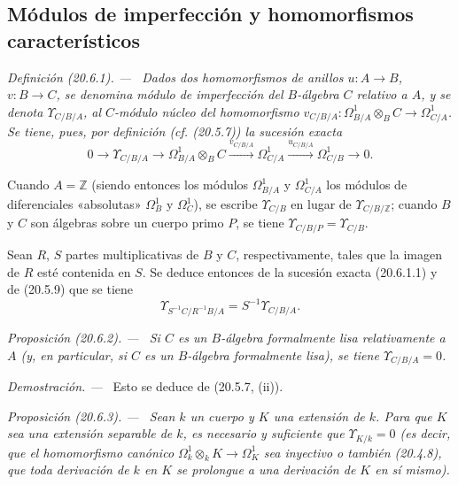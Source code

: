 \documentclass[10pt,oneside]{book}
\makeatletter
\newcommand{\setmanualcurrentlabel}[1]{\def\@currentlabel{#1}}
\newenvironment{definition}[1][]{%
  \setmanualcurrentlabel{#1}\par\medskip\noindent\itshape Definición (#1). ---\ }{\par}
\newenvironment{proposition}[1][]{%
  \setmanualcurrentlabel{#1}\par\medskip\noindent\itshape Proposición (#1). ---\ }{\par}
\newenvironment{proof}{%
  \par\medskip\noindent\textit{Demostración. ---\ }}{\par}
\makeatother
\begin{document}
\subsection{Módulos de imperfección y homomorfismos característicos}
\label{subsection:0.20.6-es}
\label{0.20.6-es}

\begin{definition}[20.6.1]
\label{0.20.6.1-es}
Dados dos homomorfismos de anillos $u:A\to B$, $v:B\to C$, se
denomina \emph{módulo de imperfección} del $B$-álgebra $C$ relativo a
$A$, y se denota $\Upsilon_{C/B/A}$, al $C$-módulo núcleo del
homomorfismo
$v_{C/B/A}:\Omega^1_{B/A}\otimes_B C\to\Omega^1_{C/A}$.
Se tiene, pues, por definición (cf. (20.5.7)) la sucesión exacta
\begin{equation}
\tag{20.6.1.1}
\label{0.20.6.1.1-es}
  0\longrightarrow\Upsilon_{C/B/A}\longrightarrow
  \Omega^1_{B/A}\otimes_B C\xrightarrow{v_{C/B/A}}
  \Omega^1_{C/A}\xrightarrow{u_{C/B/A}}\Omega^1_{C/B}
  \longrightarrow0.
\end{equation}
\end{definition}

Cuando $A=\mathbb{Z}$ (siendo entonces los módulos $\Omega^1_{B/A}$ y $\Omega^1_{C/A}$
los módulos de diferenciales «absolutas» $\Omega^1_B$ y
$\Omega^1_C$), se escribe $\Upsilon_{C/B}$ en lugar de
$\Upsilon_{C/B/\mathbb{Z}}$; cuando $B$ y $C$ son álgebras sobre un
cuerpo primo $P$, se tiene $\Upsilon_{C/B/P}=\Upsilon_{C/B}$.

Sean $R$, $S$ partes multiplicativas de $B$ y $C$, respectivamente,
tales que la imagen de $R$ esté contenida en $S$. Se deduce entonces de la
sucesión exacta (20.6.1.1) y de (20.5.9) que se tiene
\begin{equation}
\tag{20.6.1.2}
\label{0.20.6.1.2-es}
  \Upsilon_{S^{-1}C/R^{-1}B/A}=S^{-1}\Upsilon_{C/B/A}.
\end{equation}

\begin{proposition}[20.6.2]
\label{0.20.6.2-es}
Si $C$ es un $B$-álgebra formalmente lisa relativamente a $A$ \textup{(y, en
particular, si $C$ es un $B$-álgebra \emph{formalmente lisa})}, se tiene
$\Upsilon_{C/B/A}=0$.
\end{proposition}

\begin{proof}
Esto se deduce de (20.5.7, (ii)).
\end{proof}

\begin{proposition}[20.6.3]
\label{0.20.6.3-es}
Sean $k$ un cuerpo y $K$ una extensión de $k$. Para que $K$ sea una
extensión separable de $k$, es necesario y suficiente que $\Upsilon_{K/k}=0$
\textup{(es decir, que el homomorfismo canónico
$\Omega^1_k\otimes_k K\to\Omega^1_K$ sea \emph{inyectivo} o también (20.4.8), que
toda derivación de $k$ en $K$ \emph{se prolongue} a una derivación de $K$
en sí mismo)}.
\end{proposition}
\end{document}
